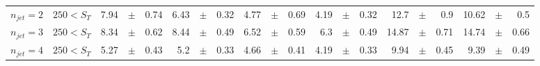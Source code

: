 \documentclass[12pt]{paper}
\begin{document}
\begin{sidewaystable}[ht]
\begin{center}
\begin{tabular}{cc|rrr|rrr|rrr|rrr|rrr|rrr}
$n_{jet}=2$ & $250< S_{T}$ & 7.94&$\pm$&0.74 & 6.43&$\pm$&0.32 & 4.77&$\pm$&0.69 & 4.19&$\pm$&0.32 & 12.7&$\pm$&0.9 & 10.62&$\pm$&0.5\\
$n_{jet}=3$ & $250< S_{T}$ & 8.34&$\pm$&0.62 & 8.44&$\pm$&0.49 & 6.52&$\pm$&0.59 & 6.3&$\pm$&0.49 & 14.87&$\pm$&0.71 & 14.74&$\pm$&0.66\\
$n_{jet}=4$ & $250< S_{T}$ & 5.27&$\pm$&0.43 & 5.2&$\pm$&0.33 & 4.66&$\pm$&0.41 & 4.19&$\pm$&0.33 & 9.94&$\pm$&0.45 & 9.39&$\pm$&0.49\\
\end{tabular}
\end{center}
\end{sidewaystable}

%
%

\end{document}
